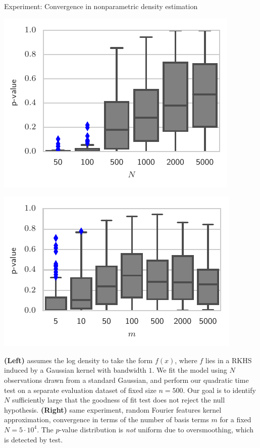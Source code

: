 \begin{frame}
\begin{columns}
\begin{column}{.32\linewidth}
\begin{block}{Experiment: Convergence in nonparametric density estimation}
\begin{center}
\begin{minipage}{.45\linewidth}
            \includegraphics[width=\textwidth]{../../presentation/img/increasing_data_fixed_test}
\end{minipage}
\begin{minipage}{.450\linewidth}
\includegraphics[width=\textwidth]{../../presentation/img/increasing_features_fixed_test}\\
\end{minipage}

\end{center}

\footnotesize
\textbf{(Left)} assumes
the log density to take the form $f(x)$, where $f$ lies in a RKHS
induced by a Gaussian kernel with bandwidth $1$. We fit the model
using $N$ observations drawn from a standard Gaussian, and perform
our quadratic time test on a separate evaluation dataset of fixed
size $n=500$. Our goal is to identify $N$ sufficiently large that
the goodness of fit test does not reject the null hypothesis.
\textbf{(Right)} same experiment,  random Fourier features kernel approximation,  convergence in terms of the number of basis terms $m$ for a fixed $N=5\cdot10^4$. The $p$-value distribution is {\em not} uniform
due to oversmoothing, which is detected by test.


\end{block}
\end{column}
\end{columns}
\end{frame}
